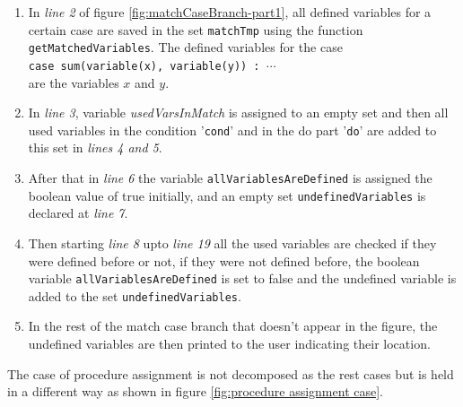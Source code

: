 \documentclass[11pt]{report}
\begin{document}
\begin{enumerate}
\item In \textsl{line 2} of figure \ref{fig:matchCaseBranch-part1}, all defined variables for a certain case are saved in the set \texttt{matchTmp} using the function \texttt{getMatchedVariables}. The defined variables for the case
\\[0.2cm]
\hspace*{0.6cm} 
\texttt{case sum(variable(x), variable(y)) : $\cdots$}
\\[0.2cm]
are the variables $x$ and $y$.

\item In \textsl{line 3}, variable \textsl{usedVarsInMatch} is assigned to an empty set and then all used variables in the condition '\texttt{cond}' and in the do part '\texttt{do}' are added to this set in \textsl{lines 4 and 5}.

\item After that in \textsl{line 6} the variable \texttt{allVariablesAreDefined} is assigned the boolean value of true initially, and an empty set \texttt{undefinedVariables} is declared at \textsl{line 7}.

\item Then starting \textsl{line 8} upto \textsl{line 19} all the used variables are checked if they were defined before or not, if they were not defined before, the boolean variable \texttt{allVariablesAreDefined} is set to false and the undefined variable is added to the set \texttt{undefinedVariables}.

\item In the rest of the match case branch that doesn't appear in the figure, the undefined variables are then printed to the user indicating their location.

\end{enumerate}

The case of procedure assignment is not decomposed as the rest cases but is held in a different way as shown in figure \ref{fig:procedure assignment case}.
\end{document}
